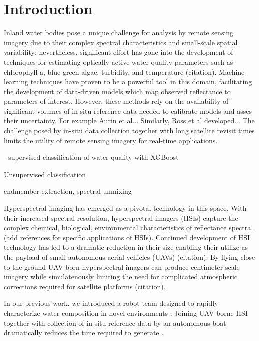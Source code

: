 \documentclass[remotesensing,article,submit,pdftex,moreauthors]{Definitions/mdpi}
\begin{document}
\section{Introduction}

Inland water bodies pose a unique challenge for analysis by remote sensing imagery due to their complex spectral characteristics and small-scale spatial variability; nevertheless, significant effort has gone into the development of techniques for estimating optically-active water quality parameters such as chlorophyll-a, blue-green algae, turbidity, and temperature (citation). Machine learning techniques have proven to be a powerful tool in this domain, facilitating the development of data-driven models which map observed reflectance to parameters of interest. However, these methods rely on the availability of significant volumes of in-situ reference data needed to calibrate models and asses their uncertainty. For example Aurin et al... Similarly, Ross et al developed... The challenge posed by in-situ data collection together with long satellite revisit times limits the utility of remote sensing imagery for real-time applications.

- supervised classification of water quality with XGBoost \cite{ghatkar2019classification}

Unsupervised classification

endmember extraction, spectral unmixing

Hyperspectral imaging has emerged as a pivotal technology in this space. With their increased spectral resolution, hyperspectral imagers (HSIs) capture the complex chemical, biological, environmental characteristics of reflectance spectra. (add references for specific applications of HSIs). Continued development of HSI technology has led to a dramatic reduction in their size enabling their utilize as the payload of small autonomous aerial vehicles (UAVs) (citation). By flying close to the ground UAV-born hyperspectral imagers can produce centimeter-scale imagery while simulatenously limiting the need for complicated atmospheric corrections required for satellite platforms (citation).  

In our previous work, we introduced a robot team designed to rapidly characterize water composition in novel environments \cite{robot-team-1}. 
Joining UAV-borne HSI together with collection of in-situ reference data by an autonomous boat dramatically reduces the time required to generate .
\end{document}
